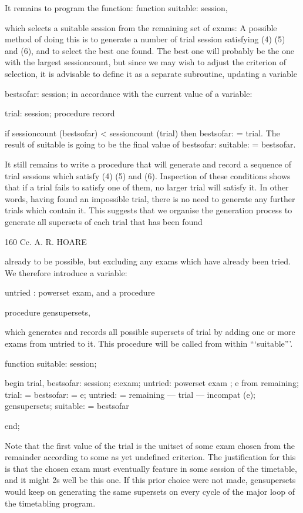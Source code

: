 It remains to program the function: function suitable: session,

which selects a suitable session from the remaining set of exams: A possible method of doing this is to generate a number of trial session satisfying (4) (5) and (6), and to select the best one found. The best one will probably be the one with the largest sessioncount, but since we may wish to adjust the criterion of selection, it is advisable to define it as a separate subroutine, updating a variable

bestsofar: session; in accordance with the current value of a variable:

trial: session; procedure record

if sessioncount (bestsofar) < sessioncount (trial) then bestsofar: = trial. The result of suitable is going to be the final value of bestsofar: suitable: = bestsofar.

It still remains to write a procedure that will generate and record a sequence of trial sessions which satisfy (4) (5) and (6). Inspection of these conditions shows that if a trial fails to satisfy one of them, no larger trial will satisfy it. In other words, having found an impossible trial, there is no need to generate any further trials which contain it. This suggests that we organise the generation process to generate all supersets of each trial that has been found

160 Cc. A. R. HOARE

already to be possible, but excluding any exams which have already been tried. We therefore introduce a variable:

untried : powerset exam, and a procedure

procedure gensupersets,

which generates and records all possible supersets of trial by adding one or more exams from untried to it. This procedure will be called from within “‘suitable”’.

function suitable: session;

begin trial, bestsofar: session; e:exam; untried: powerset exam ; e from remaining; trial: = bestsofar: = {e}; untried: = remaining — trial — incompat (e); gensupersets; suitable: = bestsofar

end;

Note that the first value of the trial is the unitset of some exam chosen from the remainder according to some as yet undefined criterion. The justification for this is that the chosen exam must eventually feature in some session of the timetable, and it might 2s well be this one. If this prior choice were not made, gensupersets would keep on generating the same supersets on every cycle of the major loop of the timetabling program.

